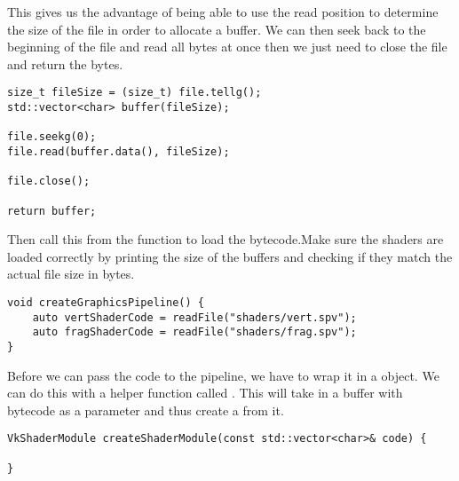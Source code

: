 \par This gives us the advantage of being able to use the read position to determine the size of the file in order to allocate a buffer. We can then seek back to the beginning of the file and read all bytes at once then we just need to close the file and return the bytes.

\begin{center}
\begin{minipage}{0.95\linewidth}
\begin{lstlisting}
size_t fileSize = (size_t) file.tellg();
std::vector<char> buffer(fileSize);

file.seekg(0);
file.read(buffer.data(), fileSize);

file.close();

return buffer;
\end{lstlisting}
\end{minipage}
\end{center}

\par Then call this from the  function to load the bytecode.Make sure the shaders are loaded correctly by printing the size of the buffers and checking if they match the actual file size in bytes.

\begin{center}
\begin{minipage}{0.95\linewidth}
\begin{lstlisting}
void createGraphicsPipeline() {
    auto vertShaderCode = readFile("shaders/vert.spv");
    auto fragShaderCode = readFile("shaders/frag.spv");
}
\end{lstlisting}
\end{minipage}
\end{center}

\par Before we can pass the code to the pipeline, we have to wrap it in a  object. We can do this with a helper function called . This will take in a buffer with bytecode as a parameter and thus create a  from it.

\begin{center}
\begin{minipage}{0.95\linewidth}
\begin{lstlisting}
VkShaderModule createShaderModule(const std::vector<char>& code) {

}
\end{lstlisting}
\end{minipage}
\end{center}


